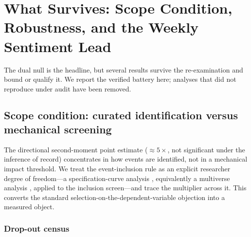 \documentclass[pdflatex,sn-mathphys-num]{sn-jnl}
\theoremstyle{thmstyleone}
\theoremstyle{thmstyletwo}
\theoremstyle{thmstylethree}
\begin{document}

\section{What Survives: Scope Condition, Robustness, and the Weekly Sentiment Lead}\label{sec:robustness}

The dual null is the headline, but several results survive the re-examination and bound or qualify it. We report the verified battery here; analyses that did not reproduce under audit have been removed.

\subsection{Scope condition: curated identification versus mechanical screening}\label{sec:selection_bias}

The directional second-moment point estimate ($\approx 5\times$, not significant under the inference of record) concentrates in how events are identified, not in a mechanical impact threshold. We treat the event-inclusion rule as an explicit researcher degree of freedom---a specification-curve analysis \citep{Simonsohn2020SpecCurve}, equivalently a multiverse analysis \citep{Steegen2016Multiverse}, applied to the inclusion screen---and trace the multiplier across it. This converts the standard selection-on-the-dependent-variable objection into a measured object.

\subsubsection{Drop-out census}
\end{document}
